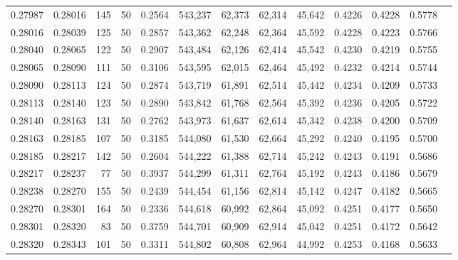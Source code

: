 \begin{tabular}{rrrrrrrrrrrrr}
0.27987 & 0.28016 &   145 &  50 &                                     0.2564 & 543,237 &  62,373 &  62,314 &  45,642 & 0.4226 & 0.4228 & 0.5778 \\
0.28016 & 0.28039 &   125 &  50 &                                     0.2857 & 543,362 &  62,248 &  62,364 &  45,592 & 0.4228 & 0.4223 & 0.5766 \\
0.28040 & 0.28065 &   122 &  50 &                                     0.2907 & 543,484 &  62,126 &  62,414 &  45,542 & 0.4230 & 0.4219 & 0.5755 \\
0.28065 & 0.28090 &   111 &  50 &                                     0.3106 & 543,595 &  62,015 &  62,464 &  45,492 & 0.4232 & 0.4214 & 0.5744 \\
0.28090 & 0.28113 &   124 &  50 &                                     0.2874 & 543,719 &  61,891 &  62,514 &  45,442 & 0.4234 & 0.4209 & 0.5733 \\
0.28113 & 0.28140 &   123 &  50 &                                     0.2890 & 543,842 &  61,768 &  62,564 &  45,392 & 0.4236 & 0.4205 & 0.5722 \\
0.28140 & 0.28163 &   131 &  50 &                                     0.2762 & 543,973 &  61,637 &  62,614 &  45,342 & 0.4238 & 0.4200 & 0.5709 \\
0.28163 & 0.28185 &   107 &  50 &                                     0.3185 & 544,080 &  61,530 &  62,664 &  45,292 & 0.4240 & 0.4195 & 0.5700 \\
0.28185 & 0.28217 &   142 &  50 &                                     0.2604 & 544,222 &  61,388 &  62,714 &  45,242 & 0.4243 & 0.4191 & 0.5686 \\
0.28217 & 0.28237 &    77 &  50 &                                     0.3937 & 544,299 &  61,311 &  62,764 &  45,192 & 0.4243 & 0.4186 & 0.5679 \\
0.28238 & 0.28270 &   155 &  50 &                                     0.2439 & 544,454 &  61,156 &  62,814 &  45,142 & 0.4247 & 0.4182 & 0.5665 \\
0.28270 & 0.28301 &   164 &  50 &                                     0.2336 & 544,618 &  60,992 &  62,864 &  45,092 & 0.4251 & 0.4177 & 0.5650 \\
0.28301 & 0.28320 &    83 &  50 &                                     0.3759 & 544,701 &  60,909 &  62,914 &  45,042 & 0.4251 & 0.4172 & 0.5642 \\
0.28320 & 0.28343 &   101 &  50 &                                     0.3311 & 544,802 &  60,808 &  62,964 &  44,992 & 0.4253 & 0.4168 & 0.5633 \\

\end{tabular}
